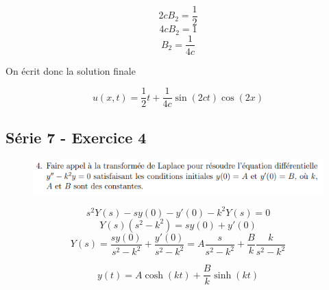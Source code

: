 \documentclass[resume]{subfiles}
\begin{document}
\begin{multicols}{2}
$$2cB_2=\frac{1}{2}$$
$$4cB_2=1$$
$$\boxed{B_2=\frac{1}{4c}}$$

On écrit donc la solution finale

$$\boxed{u(x,t)=\frac{1}{2}t+\frac{1}{4c}\sin(2ct)\cos(2x)}$$
\subsection{Série 7 - Exercice 4}
\label{S7E4}
\begin{figure}[H]
\centering
\includegraphics[scale=0.5]{img_17.png}
\end{figure}
$$s^2Y(s)-sy(0)-y'(0)-k^2Y(s)=0$$
$$Y(s)(s^2-k^2)=sy(0)+y'(0)$$
$$Y(s)=\frac{sy(0)}{s^2-k^2}+\frac{y'(0)}{s^2-k^2}=A\frac{s}{s^2-k^2}+\frac{B}{k}\frac{k}{s^2-k^2}$$

$$\boxed{y(t)=A\cosh(kt)+\frac{B}{k}\sinh(kt)}$$


\end{multicols}
\end{document}
